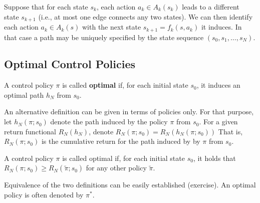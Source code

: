 \begin{remark} Suppose that for each state ${s_k}$, each action ${a_k} \in {A_k}({s_k})$ leads to a different state ${s_{k + 1}}$ (i.e., at most one edge connects any two states). We can then identify each action ${a_k} \in {A_k}(s)$ with the next state ${s_{k + 1}} = {f_k}(s,{a_k})$ it induces. In that case a path may be uniquely specified by the state sequence $({s_0},{s_1}, \ldots ,{s_N})$.
\end{remark}

\subsection{Optimal Control Policies}

\begin{definition} A control policy $\pi $ is called \textbf{optimal} if, for each initial state ${s_0}$, it induces an optimal path ${h_N}$ from ${s_0}$.
\end{definition}

An alternative definition can be given in terms of policies only. For that purpose, let ${h_N}(\pi ;{s_0})$ denote the path induced by the policy $\pi $ from ${s_0}$.  For a given return  functional ${R_N}({h_N})$, denote
${R_N}(\pi ;{s_0}) = {R_N}({h_N}(\pi ;{s_0}))$
That is, ${R_N}(\pi ;{s_0})$ is the cumulative return for the path induced by by $\pi $ from ${s_0}$.

\begin{definition} A control policy $\pi $ is called optimal if, for each initial state ${s_0}$, it holds that ${R_N}(\pi ;{s_0}) \ge {R_N}(\tilde \pi ;{s_0})$
for any other policy $\tilde \pi $.
\end{definition}

Equivalence of the two definitions can be easily established (exercise). An optimal policy is often denoted by ${\pi ^*}$.

\vspace{10pt}


\normalsize
